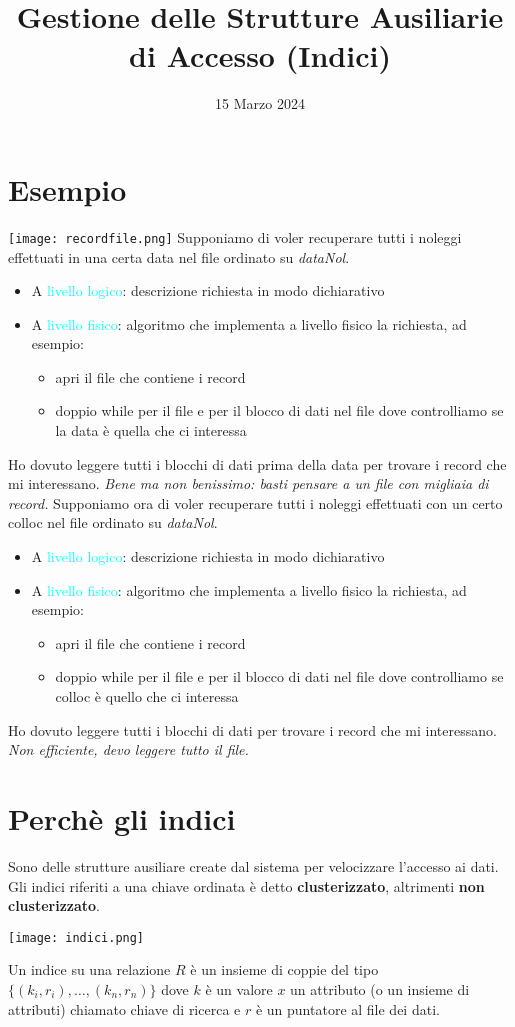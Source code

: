 \documentclass[12pt]{article}
\title{Gestione delle Strutture Ausiliarie di Accesso (Indici)}
\date{15 Marzo 2024}
\begin{document}
\maketitle
\section{Esempio}
\texttt{[image: recordfile.png]}
Supponiamo di voler recuperare tutti i noleggi effettuati in una certa data nel file ordinato su \textit{dataNol}. 
\begin{itemize}
    \item A \textcolor{Cyan}{ livello logico}: descrizione richiesta in modo dichiarativo
    \item A \textcolor{Cyan}{livello fisico}: algoritmo che implementa a livello fisico la richiesta, ad esempio:
    \begin{itemize}
        \item apri il file che contiene i record
        \item doppio while per il file e per il blocco di dati nel file dove controlliamo se la data è quella che ci interessa
    \end{itemize}
\end{itemize}
Ho dovuto leggere tutti i blocchi di dati prima della data per trovare i record che mi interessano. \textit{Bene ma non benissimo: basti pensare a un file con migliaia di record.}\newpage
Supponiamo ora di voler recuperare tutti i noleggi effettuati con un certo colloc nel file ordinato su \textit{dataNol}.
\begin{itemize}
    \item A \textcolor{Cyan}{ livello logico}: descrizione richiesta in modo dichiarativo
    \item A \textcolor{Cyan}{livello fisico}: algoritmo che implementa a livello fisico la richiesta, ad esempio:
    \begin{itemize}
        \item apri il file che contiene i record
        \item doppio while per il file e per il blocco di dati nel file dove controlliamo se colloc è quello che ci interessa
    \end{itemize}
\end{itemize}
Ho dovuto leggere tutti i blocchi di dati per trovare i record che mi interessano. \textit{Non efficiente, devo leggere tutto il file.}
\section{Perchè gli indici}
Sono delle strutture ausiliare create dal sistema per velocizzare l'accesso ai dati. Gli indici riferiti a una chiave ordinata è detto \textbf{clusterizzato}, altrimenti \textbf{non clusterizzato}.
\begin{center}
    \texttt{[image: indici.png]}
\end{center}
Un indice su una relazione $R$ è un insieme di coppie del tipo $\{(k_{i}, r_{i}),\dots,(k_{n}, r_{n})\}$ dove $k$ è un valore $x$ un attributo (o un insieme di attributi) chiamato chiave di ricerca e $r$ è un puntatore al file dei dati.
\end{document}
